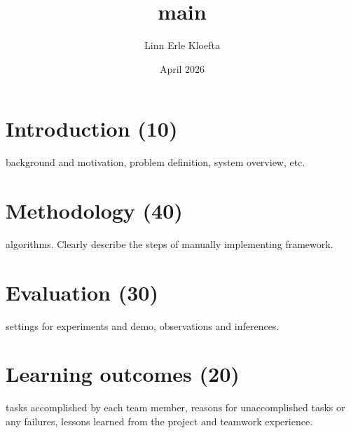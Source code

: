 \documentclass{article}
\title{main}
\author{Linn Erle Kloefta}
\date{April 2026}
\begin{document}
\maketitle

\section{Introduction (10)}
background and motivation, problem definition, system overview, etc. 

\section{Methodology (40)}
algorithms.  Clearly describe the steps of manually implementing framework. 

\section{Evaluation (30)}
settings for experiments and demo, observations and inferences. 

\section{Learning outcomes (20)}
tasks accomplished by each team member, reasons for unaccomplished tasks or any failures, lessons learned from the project and teamwork experience. 
\end{document}
